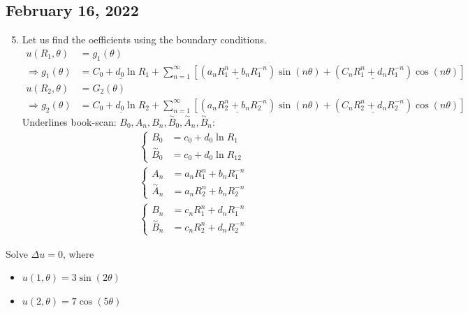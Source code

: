 \documentclass{article}
\newcommand{\twiddle}[1]{\overset{\sim}{#1}}
\begin{document}
\subsection*{February 16, 2022}
\begin{enumerate}
  \setcounter{enumi}{4}
  \item Let us find the oefficients using the boundary conditions.
  \begin{align}
    u(R_1, \theta) & = g_1(\theta)\\
    \Rightarrow g_1(\theta) & = \underline{C_0 + d_0 \ln R_1} +
    \sum^\infty_{n = 1}
    \left[
    (\underline{a_nR^n_1 + b_nR^{-n}_1}) \sin(n \theta) +
    (\underline{C_n R^n_1 + d_n R^{-n}_1}) \cos(n \theta)
    \right]\\
    u(R_2, \theta) & = G_2(\theta)\\
    \Rightarrow g_2(\theta) & = \underline{C_0 + d_0 \ln R_2} +
    \sum^\infty_{n = 1}
    \left[
    (\underline{a_n R^n_2 + b_n R^{-n}_2}) \sin(n \theta) +
    (\underline{C_n R^n_2 + d_n R^{-n}_2}) \cos(n \theta)
    \right]
  \end{align}
  Underlines book-scan: $B_0, A_n, B_n, \twiddle B_0, \twiddle A_n, \twiddle B_n$:
  \begin{align}
    &
    \begin{cases}
      B_0 & = c_0 + d_0 \ln R_1\\
      \twiddle B_0 & = c_0 + d_0 \ln R_12
    \end{cases}\\
    &
    \begin{cases}
                A_n & = a_n R^n_1 + b_nR^{-n}_1\\
      \twiddle  A_n & = a_n R^n_2 + b_nR^{-n}_2
    \end{cases}\\
    &
    \begin{cases}
               B_n & = c_n R^n_1 + d_n R^{-n}_1\\
      \twiddle B_n & = c_n R^n_2 + d_n R^{-n}_2
    \end{cases}
  \end{align}
\end{enumerate}
\ex Solve $\Delta u = 0$, where
\begin{itemize}
  \item $u(1, \theta) = 3 \sin( 2 \theta )$
  \item $u(2, \theta) = 7 \cos( 5 \theta )$
\end{itemize}
%
\end{document}
